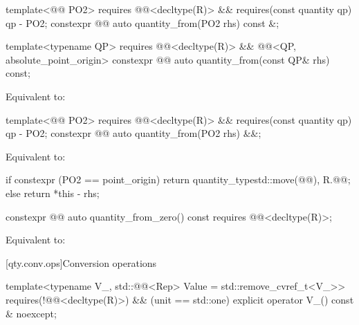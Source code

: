 \begin{itemdecl}
template<@@ PO2>
  requires @@<decltype(R)> && requires(const quantity qp) { qp - PO2{}; }
constexpr @@ auto quantity_from(PO2 rhs) const &;

template<typename QP>
  requires @@<decltype(R)> && @@<QP, absolute_point_origin>
constexpr @@ auto quantity_from(const QP& rhs) const;
\end{itemdecl}

\begin{itemdescr}
\pnum
\effects
Equivalent to:
\end{itemdescr}

\begin{itemdecl}
template<@@ PO2>
  requires @@<decltype(R)> && requires(const quantity qp) { qp - PO2{}; }
constexpr @@ auto quantity_from(PO2 rhs) &&;
\end{itemdecl}

\begin{itemdescr}
\pnum
\effects
Equivalent to:
\begin{codeblock}
if constexpr (PO2{} == point_origin)
  return quantity_type{std::move(@@), R.@@};
else
  return *this - rhs;
\end{codeblock}
\end{itemdescr}

\begin{itemdecl}
constexpr @@ auto quantity_from_zero() const
  requires @@<decltype(R)>;
\end{itemdecl}

\begin{itemdescr}
\pnum
\effects
Equivalent to:
\end{itemdescr}

[qty.conv.ops]{Conversion operations}

\begin{itemdecl}
template<typename V_, std::@@<Rep> Value = std::remove_cvref_t<V_>>
  requires(!@@<decltype(R)>) && (unit == std::one)
explicit operator V_() const & noexcept;
\end{itemdecl}

